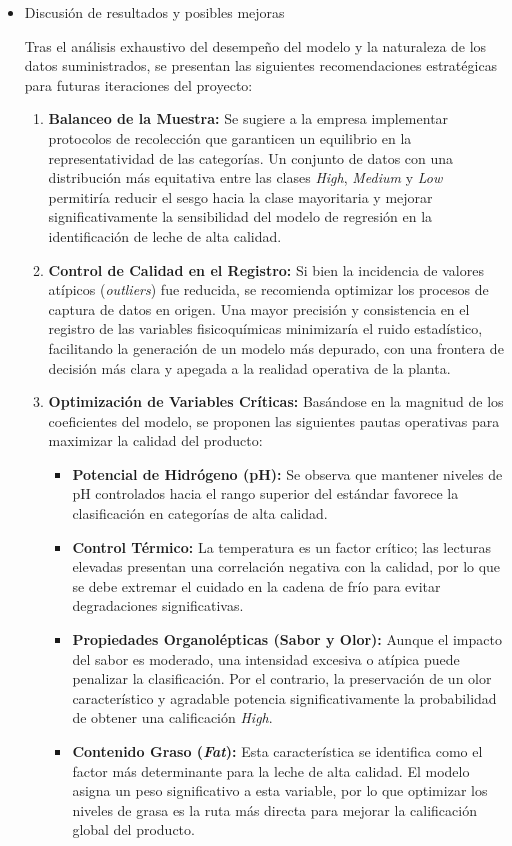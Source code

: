 \documentclass[12pt,a4paper]{article}
\begin{document}
\begin{itemize}
	\item[$\scalebox{0.7}{$\blacksquare$}$] Discusión de resultados y posibles mejoras
	
	Tras el análisis exhaustivo del desempeño del modelo y la naturaleza de los datos suministrados, se presentan las siguientes recomendaciones estratégicas para futuras iteraciones del proyecto:
	
	\begin{enumerate}
		\item \textbf{Balanceo de la Muestra:} Se sugiere a la empresa implementar protocolos de recolección que garanticen un equilibrio en la representatividad de las categorías. Un conjunto de datos con una distribución más equitativa entre las clases \textit{High}, \textit{Medium} y \textit{Low} permitiría reducir el sesgo hacia la clase mayoritaria y mejorar significativamente la sensibilidad del modelo de regresión en la identificación de leche de alta calidad.
		
		
		
		\item \textbf{Control de Calidad en el Registro:} Si bien la incidencia de valores atípicos (\textit{outliers}) fue reducida, se recomienda optimizar los procesos de captura de datos en origen. Una mayor precisión y consistencia en el registro de las variables fisicoquímicas minimizaría el ruido estadístico, facilitando la generación de un modelo más depurado, con una frontera de decisión más clara y apegada a la realidad operativa de la planta.
		
		
		
		\item \textbf{Optimización de Variables Críticas:} Basándose en la magnitud de los coeficientes del modelo, se proponen las siguientes pautas operativas para maximizar la calidad del producto:
		\begin{itemize}
			\item \textbf{Potencial de Hidrógeno (pH):} Se observa que mantener niveles de pH controlados hacia el rango superior del estándar favorece la clasificación en categorías de alta calidad.
			\item \textbf{Control Térmico:} La temperatura es un factor crítico; las lecturas elevadas presentan una correlación negativa con la calidad, por lo que se debe extremar el cuidado en la cadena de frío para evitar degradaciones significativas.
			\item \textbf{Propiedades Organolépticas (Sabor y Olor):} Aunque el impacto del sabor es moderado, una intensidad excesiva o atípica puede penalizar la clasificación. Por el contrario, la preservación de un olor característico y agradable potencia significativamente la probabilidad de obtener una calificación \textit{High}.
			\item \textbf{Contenido Graso (\textit{Fat}):} Esta característica se identifica como el factor más determinante para la leche de alta calidad. El modelo asigna un peso significativo a esta variable, por lo que optimizar los niveles de grasa es la ruta más directa para mejorar la calificación global del producto.
			

\end{itemize}
\end{enumerate}
\end{itemize}
\end{document}

